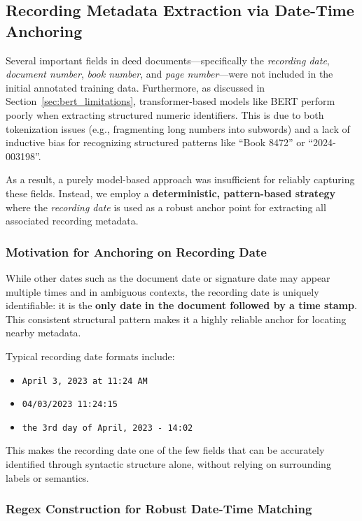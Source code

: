 \documentclass{article}
\begin{document}
\subsection{Recording Metadata Extraction via Date-Time Anchoring}

Several important fields in deed documents—specifically the \textit{recording date}, \textit{document number}, \textit{book number}, and \textit{page number}—were not included in the initial annotated training data. Furthermore, as discussed in Section~\ref{sec:bert_limitations}, transformer-based models like BERT perform poorly when extracting structured numeric identifiers. This is due to both tokenization issues (e.g., fragmenting long numbers into subwords) and a lack of inductive bias for recognizing structured patterns like ``Book 8472'' or ``2024-003198''. 

As a result, a purely model-based approach was insufficient for reliably capturing these fields. Instead, we employ a \textbf{deterministic, pattern-based strategy} where the \textit{recording date} is used as a robust anchor point for extracting all associated recording metadata.

\subsubsection{Motivation for Anchoring on Recording Date}

While other dates such as the document date or signature date may appear multiple times and in ambiguous contexts, the recording date is uniquely identifiable: it is the \textbf{only date in the document followed by a time stamp}. This consistent structural pattern makes it a highly reliable anchor for locating nearby metadata.

Typical recording date formats include:

\begin{itemize}
    \item \texttt{April 3, 2023 at 11:24 AM}
    \item \texttt{04/03/2023 11:24:15}
    \item \texttt{the 3rd day of April, 2023 - 14:02}
\end{itemize}

This makes the recording date one of the few fields that can be accurately identified through syntactic structure alone, without relying on surrounding labels or semantics.

\subsubsection{Regex Construction for Robust Date-Time Matching}
\end{document}
